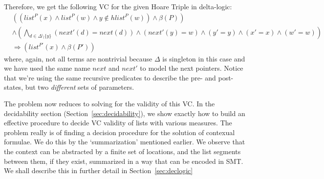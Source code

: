 \documentclass[acmsmall,review,anonymous]{acmart}\settopmatter{printfolios=true,printccs=false,printacmref=false}
\begin{document}
Therefore, we get the following VC for the given Hoare Triple in delta-logic: 
\begin{align*} 
& \left(\left(list^{P}(x) \wedge  list^{P}(w) \wedge  y \not \in hlist^{P}(w)\right) \land{} \beta{}(P)\right)  \\ 
& \land{} \left(\bigwedge_{d \in{} \Delta{} \setminus \{y\}}\left(next'(d) = next(d)\right) \land{} \left(next'(y) = w\right) \land{} \left(y' = y\right) \land{} \left(x' = x\right) \land{} \left(w' = w\right) \right)  \\
& \Rightarrow{} \left( list^{P'}(x) \land{} \beta{}(P')\right) 
\end{align*}
where, again, not all terms are nontrivial because $\Delta{}$ is singleton in this case and we have used the same name $next$ and $next'$ to model the next pointers. Notice that we're using the same recursive predicates to describe the pre- and post-states, but two \emph{different} sets of parameters.

The problem now reduces to solving for the validity of this VC. In the decidability section (Section~\ref{sec:decidability}), we show exactly how to build an effective procedure to decide VC validity of lists with various measures. The problem really is of finding a decision procedure for the solution of contexual formulae. We do this by the `summarization' mentioned earlier. We observe that the context can be abstracted by a finite set of locations, and the list segments between them, if they exist, summarized in a way that can be encoded in SMT. We shall describe this in further detail in Section~\ref{sec:declogic}
\end{document}
